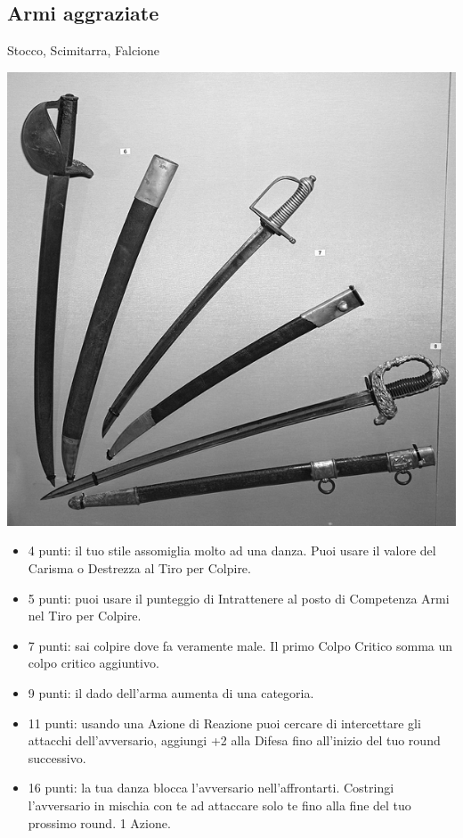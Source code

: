 \begin{multicols}{2}
\begin{itemize}[leftmargin=*]
\end{itemize}

\subsection{Armi aggraziate} Stocco, Scimitarra, Falcione\label{listaarmiaggraziate}

\medskip

\begin{center}
\includegraphics[width=0.7\linewidth]{immagini/sciabole.png}
\end{center}

\begin{itemize}[leftmargin=*] \setlength{\itemsep}{0pt}
\item 4 punti: il tuo stile assomiglia molto ad una danza. Puoi usare il valore del Carisma o Destrezza al Tiro per Colpire.
\item 5 punti: puoi usare il punteggio di Intrattenere al posto di Competenza Armi nel Tiro per Colpire.
\item 7 punti: sai colpire dove fa veramente male. Il primo Colpo Critico somma un colpo critico aggiuntivo.
\item 9 punti: il dado dell'arma aumenta di una categoria.
\item 11 punti: usando una Azione di Reazione puoi cercare di intercettare gli attacchi dell'avversario, aggiungi +2 alla Difesa fino all'inizio del tuo round successivo.
\item 16 punti: la tua danza blocca l'avversario nell'affrontarti. Costringi l'avversario in mischia con te ad attaccare solo te fino alla fine del tuo prossimo round. 1 Azione.


\end{itemize}
\end{multicols}
